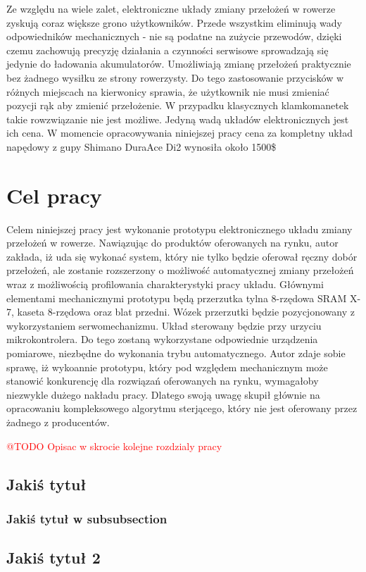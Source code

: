 Ze względu na wiele zalet, elektroniczne układy zmiany przełożeń w rowerze zyskują coraz większe grono użytkowników. Przede wszystkim eliminują wady odpowiedników mechanicznych - nie są podatne na zużycie przewodów, dzięki czemu zachowują precyzję działania a czynności serwisowe sprowadzają się jedynie do ładowania akumulatorów. Umożliwiają zmianę przełożeń praktycznie bez żadnego wysiłku ze strony rowerzysty. Do tego zastosowanie przycisków w różnych miejscach na kierwonicy sprawia, że użytkownik nie musi zmieniać pozycji rąk aby zmienić przełożenie. W przypadku klasycznych klamkomanetek takie rowzwiązanie nie jest możliwe. Jedyną wadą układów elektronicznych jest ich cena. W momencie opracowywania niniejszej pracy cena za kompletny układ napędowy z gupy Shimano DuraAce Di2 wynosiła około 1500\$

\section{Cel pracy}
\label{sec:Cel Pracy}
Celem niniejszej pracy jest wykonanie prototypu elektronicznego układu zmiany przełożeń w rowerze. Nawiązując do produktów oferowanych na rynku, autor zakłada, iż uda się wykonać system, który nie tylko będzie oferował ręczny dobór przełożeń, ale zostanie rozszerzony o możliwość automatycznej zmiany przełożeń wraz z możliwością profilowania charakterystyki pracy układu. Głównymi elementami mechanicznymi prototypu będą przerzutka tylna 8-rzędowa SRAM X-7, kaseta 8-rzędowa oraz blat przedni. Wózek przerzutki będzie pozycjonowany z wykorzystaniem serwomechanizmu. Układ sterowany będzie przy urzyciu mikrokontrolera. Do tego zostaną wykorzystane odpowiednie urządzenia pomiarowe, niezbędne do wykonania trybu automatycznego. Autor zdaje sobie sprawę, iż wykoannie prototypu, który pod względem mechanicznym może stanowić konkurencję dla rozwiązań oferowanych na rynku, wymagałoby niezwykle dużego nakładu pracy. Dlatego swoją uwagę skupił głównie na opracowaniu kompleksowego algorytmu sterjącego, który nie jest oferowany przez żadnego z producentów.      

\textcolor{red}{@TODO Opisac w skrocie kolejne rozdzialy pracy}


\subsection{Jakiś tytuł}
\subsubsection{Jakiś tytuł w subsubsection}
\subsection{Jakiś tytuł 2}